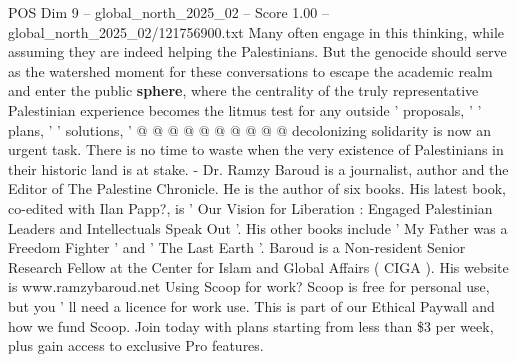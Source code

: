 \begin{textsample}{POS Dim 9 – global\_north\_2025\_02 – Score 1.00 – global\_north\_2025\_02/121756900.txt}
Many often engage in this thinking, while assuming they are indeed helping the Palestinians.
But the genocide should serve as the watershed moment for these conversations to escape the academic realm and enter the public \textbf{sphere}, where the centrality of the truly representative Palestinian experience becomes the litmus test for any outside ' proposals, ' ' plans, ' ' solutions, ' @ @ @ @ @ @ @ @ @ @ decolonizing solidarity is now an urgent task.
There is no time to waste when the very existence of Palestinians in their historic land is at stake. - Dr.
Ramzy Baroud is a journalist, author and the Editor of The Palestine Chronicle.
He is the author of six books.
His latest book, co-edited with Ilan Papp?, is ' Our Vision for Liberation : Engaged Palestinian Leaders and Intellectuals Speak Out '.
His other books include ' My Father was a Freedom Fighter ' and ' The Last Earth '.
Baroud is a Non-resident Senior Research Fellow at the Center for Islam and Global Affairs ( CIGA ).
His website is www.ramzybaroud.net Using Scoop for work?
Scoop is free for personal use, but you ' ll need a licence for work use.
This is part of our Ethical Paywall and how we fund Scoop.
Join today with plans starting from less than \$3 per week, plus gain access to exclusive Pro features.

\end{textsample}
